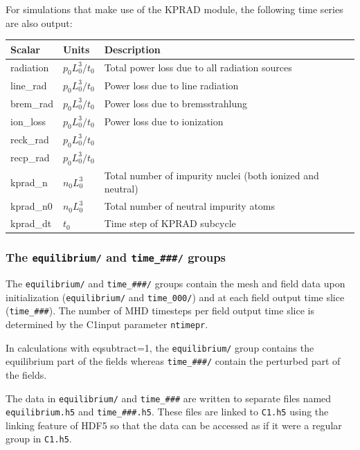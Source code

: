 For simulations that make use of the KPRAD module, the following time
series are also output:

\begin{tabular}{lll}
\textbf{Scalar}   & \textbf{Units} & \textbf{Description} \\
\hline
radiation & $p_0 L_0^3 / t_0$ & Total power loss due to all radiation sources\\
line\_rad & $p_0 L_0^3 / t_0$ & Power loss due to line radiation\\
brem\_rad & $p_0 L_0^3 / t_0$ & Power loss due to bremsstrahlung\\
ion\_loss & $p_0 L_0^3 / t_0$ & Power loss due to ionization\\
reck\_rad & $p_0 L_0^3 / t_0$ & \\
recp\_rad & $p_0 L_0^3 / t_0$ & \\
kprad\_n  & $n_0 L_0^3$ & Total number of impurity nuclei (both ionized and neutral)\\
kprad\_n0 & $n_0 L_0^3$ & Total number of neutral impurity atoms\\
kprad\_dt & $t_0$       & Time step of KPRAD subcycle
\end{tabular}


\subsubsection{The \texttt{equilibrium/} and \texttt{time\_\#\#\#/} groups}

The \texttt{equilibrium/} and \texttt{time\_\#\#\#/} groups contain the
mesh and field data upon initialization (\texttt{equilibrium/} and
\texttt{time\_000/}) and at each field output time slice
(\texttt{time\_\#\#\#}).  The number of MHD timesteps per field output
time slice is determined by the C1input parameter \texttt{ntimepr}.

In calculations with eqsubtract=1, the \texttt{equilibrium/} group
contains the equilibrium part of the fields whereas \texttt{time\_\#\#\#/}
contain the perturbed part of the fields.

The data in \texttt{equilibrium/} and \texttt{time\_\#\#\#} are written to
separate files named \texttt{equilibrium.h5} and
\texttt{time\_\#\#\#.h5}.  These files are linked to \texttt{C1.h5} using
the linking feature of HDF5 so that the data can be accessed as if it
were a regular group in \texttt{C1.h5}.

